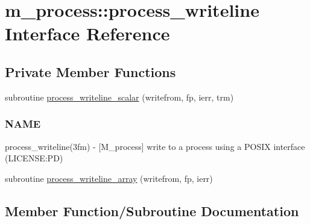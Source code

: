 \hypertarget{interfacem__process_1_1process__writeline}{}\section{m\+\_\+process\+:\+:process\+\_\+writeline Interface Reference}
\label{interfacem__process_1_1process__writeline}
\subsection*{Private Member Functions}
\begin{DoxyCompactItemize}
\item 
subroutine \mbox{\hyperlink{interfacem__process_1_1process__writeline_a9e95166556bec54fd10568f01d02f34e}{process\+\_\+writeline\+\_\+scalar}} (writefrom, fp, ierr, trm)
\begin{DoxyCompactList}\small\item\em \subsubsection*{N\+A\+ME}

process\+\_\+writeline(3fm) -\/ \mbox{[}M\+\_\+process\mbox{]} write to a process using a P\+O\+S\+IX interface (L\+I\+C\+E\+N\+SE\+:PD) \end{DoxyCompactList}\item 
subroutine \mbox{\hyperlink{interfacem__process_1_1process__writeline_aa3543e9b23056b2f35869003f777f65d}{process\+\_\+writeline\+\_\+array}} (writefrom, fp, ierr)
\end{DoxyCompactItemize}


\subsection{Member Function/\+Subroutine Documentation}
\mbox{\label{interfacem__process_1_1process__writeline_aa3543e9b23056b2f35869003f777f65d}} 
